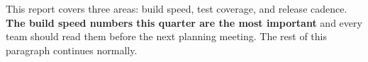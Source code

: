 \documentclass{article}
\begin{document}
This report covers three areas: build speed, test coverage, and
release cadence. \textbf{The build speed numbers this quarter are
the most important} and every team should read them before the next
planning meeting. The rest of this paragraph continues normally.
\end{document}
